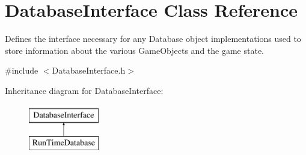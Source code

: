 \hypertarget{class_database_interface}{}\section{Database\+Interface Class Reference}
\label{class_database_interface}


Defines the interface necessary for any Database object implementations used to store information about the various Game\+Objects and the game state.  




{\ttfamily \#include $<$Database\+Interface.\+h$>$}

Inheritance diagram for Database\+Interface\+:\begin{figure}[H]
\begin{center}
\leavevmode
\includegraphics[height=2.000000cm]{d1/dff/class_database_interface}
\end{center}
\end{figure}
